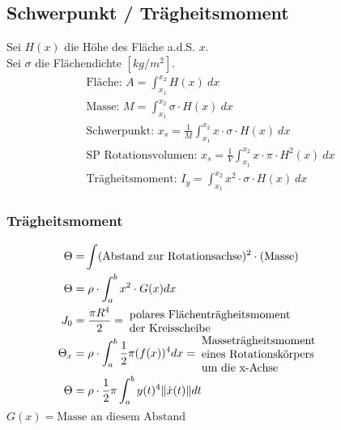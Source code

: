 \subsection{Schwerpunkt / Trägheitsmoment}
    Sei $H(x)$ die Höhe des Fläche a.d.S. $x$.\\
    Sei $\sigma$ die Flächendichte $[kg/m^2]$.
    \begin{align*}
        \textrm{Fläche: }  A = \int_{x_1}^{x_2} H(x)\ dx\\
        \textrm{Masse: }  M = \int_{x_1}^{x_2} \sigma \cdot H(x)\ dx\\
        \textrm{Schwerpunkt: }  x_s = \frac{1}{M} \int_{x_1}^{x_2} x \cdot \sigma \cdot H(x)\ dx\\
        \textrm{SP Rotationsvolumen: } x_s = \frac{1}{V} \int_{x_1}^{x_2} x \cdot \pi \cdot H^2(x)\ dx\\
        \textrm{Trägheitsmoment: }  I_y = \int_{x_1}^{x_2} x^2 \cdot \sigma \cdot H(x)\ dx
    \end{align*}
    \subsubsection{Trägheitsmoment}
    \vspace*{-1em}
        \begin{align*}
            \Theta =& \int (\textrm{Abstand zur Rotationsachse})^2 \cdot (\textrm{Masse})\\
            \Theta =& \; \rho \cdot \int_a^b x^2 \cdot G(x) dx\\
            J_0 =& \; \frac{\pi R^4}{2} = \; \parbox{5cm}{polares Flächenträgheitsmoment\\ der Kreisscheibe}\\
            \Theta_x =& \; \rho \cdot \int_a^b \frac{1}{2} \pi (f(x))^4 dx = \; \parbox{5cm}{Masseträgheitsmoment\\ eines Rotationskörpers\\ um die x-Achse}\\
            \Theta =& \; \rho \cdot \frac{1}{2} \pi \int_a^{b} y(t)^4\|\dot{x}(t)\| dt
        \end{align*}
        $G(x) = \text{Masse an diesem Abstand}$
